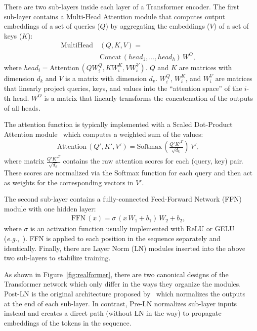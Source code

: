\documentclass[11pt,a4paper]{article}
\begin{document}
There are two sub-layers inside each layer of a Transformer encoder. The first sub-layer contains a Multi-Head Attention module that computes output embeddings of a set of queries ($Q$) by aggregating the embeddings ($V$) of a set of keys ($K$):
\begin{align*}
\text{MultiHead} \, & (Q,K,V) = \\ 
                    & \text{Concat} \, (head_1, ..., head_h)\, W^O,
\end{align*}
where $head_i = \text{Attention} \, (QW^Q_i, KW^K_i, VW^V_i)$. $Q$ and $K$ are matrices with dimension $d_k$ and $V$ is a matrix with dimension $d_v$. $W^Q_i$, $W^K_i$, and $W^V_i$ are matrices that linearly project queries, keys, and values into the ``attention space'' of the $i$-th head. $W^O$ is a matrix that linearly transforms the concatenation of the outputs of all heads.

The attention function is typically implemented with a Scaled Dot-Product Attention module~\citep{Vaswani-2017-attention} which computes a weighted sum of the values:
\begin{align*}
\text{Attention} \, (Q', K', V') = \text{Softmax} \, (\frac{Q'K'^T}{\sqrt{d_k}}) \, V',
\end{align*}
where matrix $\frac{Q'K'^T}{\sqrt{d_k}}$ contains the raw attention scores for each (query, key) pair. These scores are normalized via the Softmax function for each query and then act as weights for the corresponding vectors in $V'$.

The second sub-layer contains a fully-connected Feed-Forward Network (FFN) module with one hidden layer:
\begin{align*}
\text{FFN} \, (x) = \sigma \, (x \, W_1 + b_1) \, W_2 + b_2,
\end{align*}
where $\sigma$ is an activation function usually implemented with ReLU or GELU (\emph{e.g.},~\citet{Devlin-2019-bert}). FFN is applied to each position in the sequence separately and identically.
Finally, there are Layer Norm (LN) modules inserted into the above two sub-layers to stabilize training.

As shown in Figure~\ref{fig:realformer}, there are two canonical designs of the Transformer network which only differ in the ways they organize the modules. Post-LN is the original architecture proposed by~\citet{Vaswani-2017-attention} which normalizes the outputs at the end of each sub-layer. In contrast, Pre-LN normalizes sub-layer inputs instead and creates a direct path (without LN in the way) to propagate embeddings of the tokens in the sequence.
\end{document}
